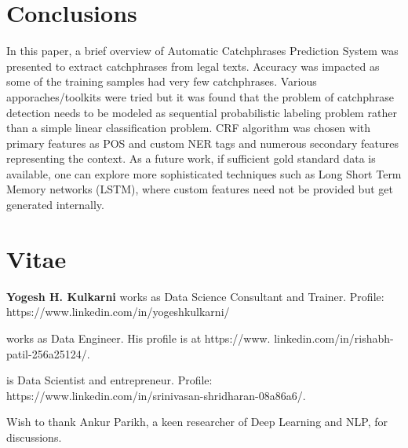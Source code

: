 \section{Conclusions}
\label{sec:conclusions}
In this paper, a brief overview of Automatic Catchphrases Prediction System was presented to extract catchphrases from legal texts. Accuracy was impacted as some of the training samples had very few catchphrases. Various apporaches/toolkits were tried but it was found that the problem of catchphrase detection needs to be modeled as sequential probabilistic labeling problem rather than a simple linear classification problem. CRF algorithm was chosen with primary features as POS and custom NER tags and numerous secondary features representing the context. 
As a future work, if sufficient gold standard data is available, one can explore more sophisticated techniques such as Long Short Term Memory networks (LSTM), where custom features need not be provided but get generated internally.

\section*{Vitae}

{\bf Yogesh H. Kulkarni} works as Data Science Consultant and Trainer. Profile: https://www.linkedin.com/in/yogeshkulkarni/

 works as Data Engineer. His profile is at https://www. linkedin.com/in/rishabh-patil-256a25124/.

 is Data Scientist and entrepreneur. Profile: https://www.linkedin.com/in/srinivasan-shridharan-08a86a6/.
\begin{acks}
  Wish to thank Ankur Parikh, a keen researcher of Deep Learning and NLP, for discussions.
\end{acks}
